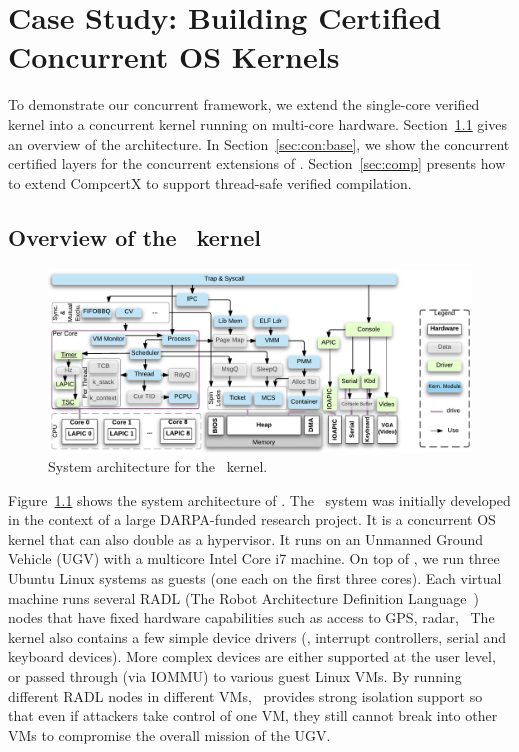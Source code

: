 \chapter{Case Study: Building Certified Concurrent OS Kernels}
\label{chap:conkernel}

To demonstrate our concurrent framework,
we extend the \mCTOS{} single-core verified kernel into a
concurrent kernel \cCTOS{} running on multi-core hardware.
Section~\ref{sec:con:overview}
gives an overview of the \cCTOS{} architecture.
In Section~\ref{sec:con:base},
we show the concurrent certified layers
for the concurrent extensions of \cCTOS{}.
Section~\ref{sec:comp} presents how
to extend CompcertX to support
thread-safe verified compilation.

\section{Overview of the \cCTOS\ kernel}
\label{sec:con:overview}

\begin{figure}[t]\centering
\includegraphics[scale=.78]{figs/sysarch}
\caption{System architecture for the \cCTOS\ kernel.}
\label{fig:sysarch}
\hrulefill
\end{figure}

Figure~\ref{fig:sysarch} shows the system architecture of \cCTOS.  The
\cCTOS\ system was initially developed in the context of a large
DARPA-funded research project.  It is a concurrent OS kernel that can
also double as a hypervisor.  It runs on an Unmanned Ground Vehicle
(UGV) with a multicore Intel Core i7 machine.  On top of
\cCTOS, we run three Ubuntu Linux systems as guests (one each
on the first three cores). Each virtual machine runs several RADL (The
Robot Architecture Definition Language~\cite{radl15}) nodes that have
fixed hardware capabilities such as access to GPS, radar, \etc\  
The kernel also contains a few simple device drivers (\eg, interrupt
controllers, serial and keyboard devices). More complex devices are
either supported at the user level, or passed through (via IOMMU) to
various guest Linux VMs. By running different RADL nodes in different
VMs, \cCTOS\ provides strong isolation support so that even if
attackers take control of one VM, they still cannot break into other
VMs to compromise the overall mission of the UGV.

